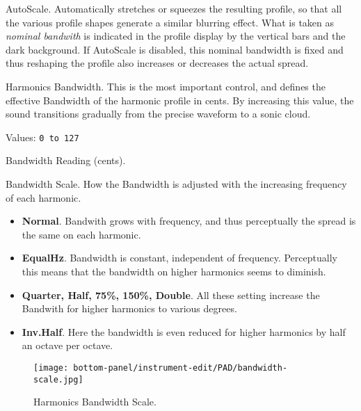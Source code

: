    \setcounter{ItemCounter}{0}      %

   AutoScale.
   Automatically stretches or squeezes the resulting profile, so that all the
   various profile shapes generate a similar blurring effect.
   What is taken as
   \textsl{nominal bandwith} is indicated in the profile display by the vertical
   bars and the dark background.
   If AutoScale is disabled, this nominal bandwidth is fixed
   and thus reshaping the profile also increases or decreases the actual spread.

   Harmonics Bandwidth.
   This is the most important control, and defines the effective Bandwidth of the
   harmonic profile in cents. By increasing this value, the sound transitions
   gradually from the precise waveform to a sonic cloud.

   Values: \texttt{0 to 127}

   Bandwidth Reading (cents).

   Bandwidth Scale.
   How the Bandwidth is adjusted with the increasing frequency of each harmonic.

   \begin{itemize}
      \item \textbf{Normal}.
         Bandwith grows with frequency, and thus perceptually the spread is the same
         on each harmonic.
      \item \textbf{EqualHz}.
         Bandwidth is constant, independent of frequency.
         Perceptually this means that the bandwidth on higher harmonics seems to
         diminish.
      \item \textbf{Quarter, Half, 75\%, 150\%, Double}.
         All these setting increase the Bandwith for higher harmonics to various
         degrees.
      \item \textbf{Inv.Half}.
         Here the bandwidth is even reduced for higher harmonics by half an octave
         per octave.
   
   \end{itemize}

\begin{figure}[H]
   \centering
   \texttt{[image: bottom-panel/instrument-edit/PAD/bandwidth-scale.jpg]}
   \caption{Harmonics Bandwidth Scale.}
   \label{fig:padsynth_harmonics_bandwidth_scale}
\end{figure}

